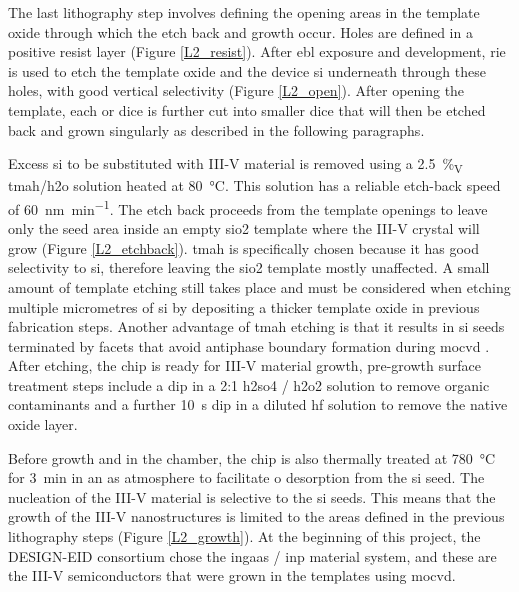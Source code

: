 The last lithography step involves defining the opening areas in the template oxide through which the etch back and growth occur. Holes are defined in a positive resist layer (Figure \ref{L2_resist}). After \acs{ebl} exposure and development, \acs{rie} is used to etch the template oxide and the device \acl{si} underneath through these holes, with good vertical selectivity (Figure \ref{L2_open}). After opening the template, each  or  dice is further cut into smaller  dice that will then be etched back and grown singularly as described in the following paragraphs.
\par
Excess \acl{si} to be substituted with III-V material is removed using a \qty{2.5}{\%_{V\per\V}} \acf{tmah}/\acf{h2o} solution heated at \qty{80}{\degreeCelsius}. This solution has a reliable etch-back speed of \qty{60}{\nm\per\minute}.  The etch back proceeds from the template openings to leave only the seed area inside an empty \acl{sio2} template where the III-V crystal will grow (Figure \ref{L2_etchback}). \Acs{tmah} is specifically chosen because it has good selectivity to \acs{si}, therefore leaving the \acs{sio2} template mostly unaffected. A small amount of template etching still takes place and must be considered when etching multiple micrometres of \acs{si} by depositing a thicker template oxide in previous fabrication steps. Another advantage of \acs{tmah} etching is that it results in \acl{si} seeds terminated by  facets that avoid antiphase boundary formation during \acf{mocvd} \cite{Kunert2018}. After etching, the chip is ready for III-V material growth, pre-growth surface treatment steps include a dip in a 2:1 \acf{h2so4} / \acf{h2o2} solution to remove organic contaminants and a further \qty{10}{s} dip in a diluted \acs{hf} solution to remove the native oxide layer. 
\par
Before growth and in the chamber, the chip is also thermally treated at \qty{780}{\degreeCelsius} for \qty{3}{\minute} in an \acs{as} atmosphere to facilitate \acl{o} desorption from the \acs{si} seed. The nucleation of the III-V material is selective to the \acl{si} seeds. This means that the growth of the III-V nanostructures is limited to the areas defined in the previous lithography steps (Figure \ref{L2_growth}). At the beginning of this project, the DESIGN-EID consortium chose the \acf{ingaas} / \acf{inp} material system, and these are the III-V semiconductors that were grown in the templates using \acs{mocvd}.